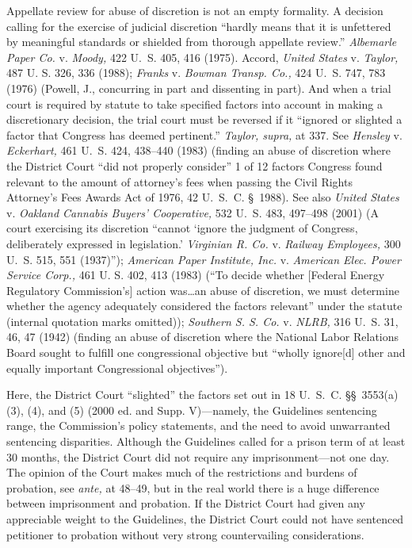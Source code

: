   Appellate review for abuse of discretion is not an empty formality.
A decision calling for the exercise of judicial discretion ``hardly
means that it is unfettered by meaningful standards or shielded from
thorough appellate review.'' \emph{Albemarle Paper Co.} v. \emph{Moody,}
422 U.~S. 405, 416 (1975). Accord, \emph{United States} v. \emph{Taylor,}
487 U. S. 326, 336 (1988); \emph{Franks} v. \emph{Bowman Transp. Co.,} 424
U.~S. 747, 783 (1976) (Powell, J., concurring in part and dissenting in
part). And when a trial court is required by statute to take specified
factors into account in making a discretionary decision, the trial court
must be reversed if it ``ignored or slighted a factor that Congress
has deemed pertinent.'' \emph{Taylor, supra,} at 337. See \emph{Hensley}
v. \emph{Eckerhart,} 461 U.~S. 424, 438--440 (1983) (finding an abuse
of discretion where the District Court ``did not properly consider''
1 of 12 factors Congress found relevant to the amount of attorney's
fees when passing the Civil Rights Attorney's Fees Awards Act of
1976, 42 U.~S.~C. \S~1988). See also \emph{United States} v. \emph{Oakland
Cannabis Buyers' Cooperative,} 532 U.~S. 483, 497--498 (2001) (A
court exercising its discretion ``cannot ‘ignore the judgment of
Congress, deliberately expressed in legislation.' \emph{Virginian R. Co.}
v. \emph{Railway Employees,} 300 U.~S. 515, 551 (1937)''); \emph{American
Paper Institute, Inc.} v. \emph{American Elec. Power Service Corp.,} 461
U. S. 402, 413 (1983) (``To decide whether [Federal Energy Regulatory
Commission's] action was\dots an abuse of discretion, we must
determine whether the agency ade\newpage quately considered the factors
relevant'' under the statute (internal quotation marks omitted));
\emph{Southern S. S. Co.} v. \emph{NLRB,} 316 U.~S. 31, 46, 47 (1942)
(finding an abuse of discretion where the National Labor Relations Board
sought to fulfill one congressional objective but ``wholly ignore[d]
other and equally important Congressional objectives'').

  Here, the District Court ``slighted'' the factors set out in
18 U.~S.~C. \S\S~3553(a)(3), (4), and (5) (2000 ed. and Supp.
V)---namely, the Guidelines sentencing range, the Commission's
policy statements, and the need to avoid unwarranted sentencing
disparities. Although the Guidelines called for a prison term
of at least 30 months, the District Court did not require any
imprisonment---not one day. The opinion of the Court makes much of the
restrictions and burdens of probation, see \emph{ante,} at 48--49, but
in the real world there is a huge difference between imprisonment and
probation. If the District Court had given any appreciable weight to the
Guidelines, the District Court could not have sentenced petitioner to
probation without very strong countervailing considerations.

